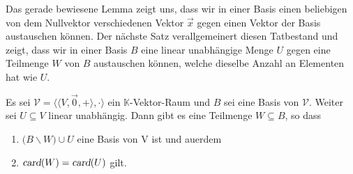 Das gerade bewiesene Lemma zeigt uns, dass wir in einer Basis einen beliebigen von dem Nullvektor
verschiedenen Vektor $\vec{x}$ 
gegen einen Vektor der Basis austauschen k\"{o}nnen.  Der n\"{a}chste Satz verallgemeinert diesen Tatbestand
und zeigt, dass wir 
in einer Basis $B$ eine linear unabh\"{a}ngige Menge $U$ gegen eine Teilmenge $W$ von $B$ austauschen
k\"{o}nnen, welche dieselbe Anzahl an Elementen hat wie $U$.

\begin{Satz}
  Es sei $\mathcal{V} = \bigl\langle \langle V, \vec{0}, + \rangle, \cdot \bigr\rangle$ ein $\mathbb{K}$-Vektor-Raum 
  und $B$ sei eine Basis von $\mathcal{V}$.  Weiter sei $U \subseteq V$ linear unabh\"{a}ngig.
  Dann gibt es eine Teilmenge $W \subseteq B$, so dass 
  \begin{enumerate}
  \item $\bigl(B \backslash W\bigr) \cup U$  eine Basis von V ist  und au\3erdem 
  \item $\textsl{card}(W) = \textsl{card}(U)$ gilt.
  \end{enumerate}
\end{Satz}

